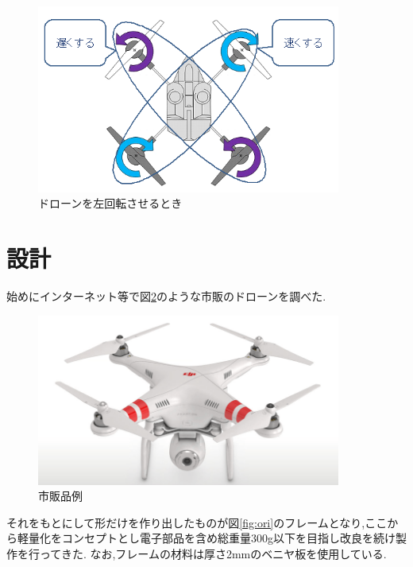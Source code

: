 \documentclass[12pt,oneside]{paper}
\begin{document}
\begin{figure}[H]
  \begin{center}
    \includegraphics[width=100mm]{ga/rol.png}
    \end{center}
  \caption{ドローンを左回転させるとき}
 \label{fig:rol}
\end{figure}


\section{設計}始めにインターネット等で図\ref{fig:sihan}のような市販のドローンを調べた.

\begin{figure}[H]
  \begin{center}
    \includegraphics[width=100mm]{ga/doron3.png}
    \end{center}
  \caption{市販品例}
 \label{fig:sihan}
\end{figure}

それをもとにして形だけを作り出したものが図\ref{fig:ori}のフレームとなり,ここから軽量化をコンセプトとし電子部品を含め総重量300g以下を目指し改良を続け製作を行ってきた.
なお,フレームの材料は厚さ2mmのベニヤ板を使用している.
\end{document}
